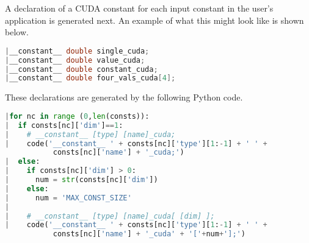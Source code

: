 A declaration of a CUDA constant for each input constant in the user's application is generated next. An example of what this might look like is shown below.
\begin{lstlisting}[backgroundcolor=\color{red!20}, language=C]
|__constant__ double single_cuda;
|__constant__ double value_cuda;
|__constant__ double constant_cuda;
|__constant__ double four_vals_cuda[4];
\end{lstlisting}

\noindent These declarations are generated by the following Python code.
\begin{lstlisting}[backgroundcolor = \color{lightgray!20}, language=Python]
|for nc in range (0,len(consts)):
|  if consts[nc]['dim']==1:
|    # __constant__ [type] [name]_cuda;
|    code('__constant__ ' + consts[nc]['type'][1:-1] + ' ' +
           consts[nc]['name'] + '_cuda;')
|  else:
|    if consts[nc]['dim'] > 0:
|      num = str(consts[nc]['dim'])
|    else:
|      num = 'MAX_CONST_SIZE'
|
|    # __constant__ [type] [name]_cuda[ [dim] ];
|    code('__constant__ ' + consts[nc]['type'][1:-1] + ' ' +
           consts[nc]['name'] + '_cuda' + '['+num+'];')
\end{lstlisting}

